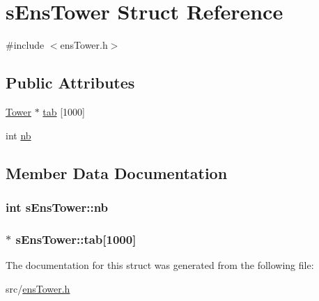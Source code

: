 \hypertarget{structs_ens_tower}{\section{s\-Ens\-Tower Struct Reference}
\label{structs_ens_tower}
}


{\ttfamily \#include $<$ens\-Tower.\-h$>$}

\subsection*{Public Attributes}
\begin{DoxyCompactItemize}
\item 
\hyperlink{tower_8h_a5070e945849fb8f0b9f8e9049b7434ba}{Tower} $\ast$ \hyperlink{structs_ens_tower_a84af3c4420cb037a711b436c41ef6bf2}{tab} \mbox{[}1000\mbox{]}
\item 
int \hyperlink{structs_ens_tower_a92f7cb5d8f8be20ed5028e13f7a17d5e}{nb}
\end{DoxyCompactItemize}


\subsection{Member Data Documentation}
\hypertarget{structs_ens_tower_a92f7cb5d8f8be20ed5028e13f7a17d5e}{
\subsubsection[{nb}]{\setlength{\rightskip}{0pt plus 5cm}int s\-Ens\-Tower\-::nb}}\label{structs_ens_tower_a92f7cb5d8f8be20ed5028e13f7a17d5e}
\hypertarget{structs_ens_tower_a84af3c4420cb037a711b436c41ef6bf2}{
\subsubsection[{tab}]{$\ast$ s\-Ens\-Tower\-::tab\mbox{[}1000\mbox{]}}}\label{structs_ens_tower_a84af3c4420cb037a711b436c41ef6bf2}


The documentation for this struct was generated from the following file\-:\begin{DoxyCompactItemize}
\item 
src/\hyperlink{ens_tower_8h}{ens\-Tower.\-h}\end{DoxyCompactItemize}
